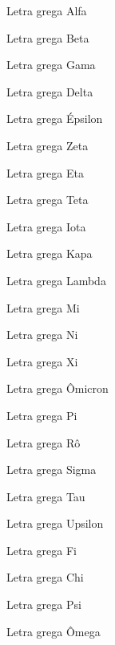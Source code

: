 \documentclass[fleqn]{profmat-cefet}
\begin{document}
\begin{multicols}{2}
    
    \begin{description}[labelsep=1em]
        \item[$\alpha$]   Letra grega Alfa
        \item[$\beta$]    Letra grega Beta
        \item[$\gamma$]   Letra grega Gama
        \item[$\delta$]   Letra grega Delta
        \item[$\epsilon$] Letra grega Épsilon
        \item[$\zeta$]    Letra grega Zeta
        \item[$\eta$]     Letra grega Eta
        \item[$\theta$]   Letra grega Teta
        \item[$\iota$]    Letra grega Iota
        \item[$\kappa$]   Letra grega Kapa
        \item[$\lambda$]  Letra grega Lambda
        \item[$\mu$]      Letra grega Mi
        \item[$\nu$]      Letra grega Ni
        \item[$\xi$]      Letra grega Xi
        \item[$o$]        Letra grega Ômicron
        \item[$\pi$]      Letra grega Pi
        \item[$\rho$]     Letra grega Rô
        \item[$\sigma$]   Letra grega Sigma
        \item[$\tau$]     Letra grega Tau
        \item[$\upsilon$] Letra grega Upsilon
        \item[$\phi$]     Letra grega Fi
        \item[$\chi$]     Letra grega Chi
        \item[$\psi$]     Letra grega Psi
        \item[$\omega$]   Letra grega Ômega
    \end{description}
    
\end{multicols}



\end{document}
